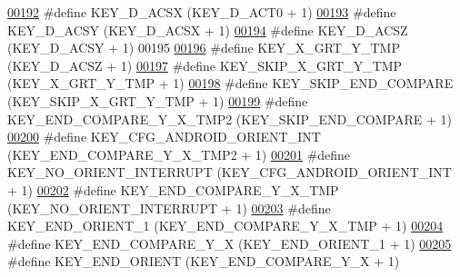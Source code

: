 \begin{DoxyCode}
\hypertarget{dmp_key_8h_source.tex_l00192}{}\hyperlink{dmp_key_8h_aac3f8565178bc31cd9c1b8276c2e7b5b}{00192} \textcolor{preprocessor}{#define KEY\_D\_ACSX                  (KEY\_D\_ACT0 + 1)}
\hypertarget{dmp_key_8h_source.tex_l00193}{}\hyperlink{dmp_key_8h_a8369f23b6e35faeb0a046ef3d9e3ce7d}{00193} \textcolor{preprocessor}{#define KEY\_D\_ACSY                  (KEY\_D\_ACSX + 1)}
\hypertarget{dmp_key_8h_source.tex_l00194}{}\hyperlink{dmp_key_8h_a831073a12eb6af4bd0e26a0295b93535}{00194} \textcolor{preprocessor}{#define KEY\_D\_ACSZ                  (KEY\_D\_ACSY + 1)}
00195 
\hypertarget{dmp_key_8h_source.tex_l00196}{}\hyperlink{dmp_key_8h_a186843904fb6bda544ba733ff7803f7b}{00196} \textcolor{preprocessor}{#define KEY\_X\_GRT\_Y\_TMP             (KEY\_D\_ACSZ + 1)}
\hypertarget{dmp_key_8h_source.tex_l00197}{}\hyperlink{dmp_key_8h_aadef1338ea6db9da1dd57dca58b22780}{00197} \textcolor{preprocessor}{#define KEY\_SKIP\_X\_GRT\_Y\_TMP        (KEY\_X\_GRT\_Y\_TMP + 1)}
\hypertarget{dmp_key_8h_source.tex_l00198}{}\hyperlink{dmp_key_8h_ab86fb35f9751e04aa23835026c12bc2d}{00198} \textcolor{preprocessor}{#define KEY\_SKIP\_END\_COMPARE        (KEY\_SKIP\_X\_GRT\_Y\_TMP + 1)}
\hypertarget{dmp_key_8h_source.tex_l00199}{}\hyperlink{dmp_key_8h_a868972f8a262529b22eb381e136db38e}{00199} \textcolor{preprocessor}{#define KEY\_END\_COMPARE\_Y\_X\_TMP2    (KEY\_SKIP\_END\_COMPARE + 1)       }
\hypertarget{dmp_key_8h_source.tex_l00200}{}\hyperlink{dmp_key_8h_af70b2e42ca4a7ba6595f038d0d129bf6}{00200} \textcolor{preprocessor}{#define KEY\_CFG\_ANDROID\_ORIENT\_INT  (KEY\_END\_COMPARE\_Y\_X\_TMP2 + 1)}
\hypertarget{dmp_key_8h_source.tex_l00201}{}\hyperlink{dmp_key_8h_a49fee5f045566542c31528c9d1635f32}{00201} \textcolor{preprocessor}{#define KEY\_NO\_ORIENT\_INTERRUPT     (KEY\_CFG\_ANDROID\_ORIENT\_INT + 1)}
\hypertarget{dmp_key_8h_source.tex_l00202}{}\hyperlink{dmp_key_8h_abe47fcf029cbd3e4c755b66b647a31e6}{00202} \textcolor{preprocessor}{#define KEY\_END\_COMPARE\_Y\_X\_TMP     (KEY\_NO\_ORIENT\_INTERRUPT + 1)}
\hypertarget{dmp_key_8h_source.tex_l00203}{}\hyperlink{dmp_key_8h_a9820d8f168cbb46606169ab66a2f2800}{00203} \textcolor{preprocessor}{#define KEY\_END\_ORIENT\_1            (KEY\_END\_COMPARE\_Y\_X\_TMP + 1)}
\hypertarget{dmp_key_8h_source.tex_l00204}{}\hyperlink{dmp_key_8h_afd623a534dace67adcd728ad56171565}{00204} \textcolor{preprocessor}{#define KEY\_END\_COMPARE\_Y\_X         (KEY\_END\_ORIENT\_1 + 1) }
\hypertarget{dmp_key_8h_source.tex_l00205}{}\hyperlink{dmp_key_8h_a8677f7b8360e93ac183cd343a2fe13e7}{00205} \textcolor{preprocessor}{#define KEY\_END\_ORIENT              (KEY\_END\_COMPARE\_Y\_X + 1)}

\end{DoxyCode}
